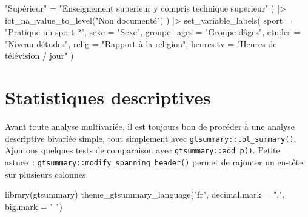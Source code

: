 \documentclass[
  letterpaper,
  DIV=11,
  numbers=noendperiod,
  oneside]{scrreprt}
\newenvironment{Shaded}{\begin{snugshade}}{\end{snugshade}}
\newcommand{\AttributeTok}[1]{\textcolor[rgb]{0.40,0.45,0.13}{#1}}
\newcommand{\FunctionTok}[1]{\textcolor[rgb]{0.28,0.35,0.67}{#1}}
\newcommand{\NormalTok}[1]{\textcolor[rgb]{0.00,0.23,0.31}{#1}}
\newcommand{\OtherTok}[1]{\textcolor[rgb]{0.00,0.23,0.31}{#1}}
\newcommand{\SpecialCharTok}[1]{\textcolor[rgb]{0.37,0.37,0.37}{#1}}
\newcommand{\StringTok}[1]{\textcolor[rgb]{0.13,0.47,0.30}{#1}}
\begin{document}
\begin{tcolorbox}
\begin{Shaded}
\begin{Highlighting}[]
        \StringTok{"Supérieur"} \OtherTok{=} \StringTok{"Enseignement superieur y compris technique superieur"}
\NormalTok{    ) }\SpecialCharTok{|\textgreater{}} 
    \FunctionTok{fct\_na\_value\_to\_level}\NormalTok{(}\StringTok{"Non documenté"}\NormalTok{)  }
\NormalTok{  ) }\SpecialCharTok{|\textgreater{}} 
  \FunctionTok{set\_variable\_labels}\NormalTok{(}
    \AttributeTok{sport =} \StringTok{"Pratique un sport ?"}\NormalTok{,}
    \AttributeTok{sexe =} \StringTok{"Sexe"}\NormalTok{,}
    \AttributeTok{groupe\_ages =} \StringTok{"Groupe d\textquotesingle{}âges"}\NormalTok{,}
    \AttributeTok{etudes =} \StringTok{"Niveau d\textquotesingle{}études"}\NormalTok{,}
    \AttributeTok{relig =} \StringTok{"Rapport à la religion"}\NormalTok{,}
    \AttributeTok{heures.tv =} \StringTok{"Heures de télévision / jour"}
\NormalTok{  )}
\end{Highlighting}
\end{Shaded}

\end{tcolorbox}

\hypertarget{statistiques-descriptives}{%
\section{Statistiques descriptives}\label{statistiques-descriptives}}

Avant toute analyse multivariée, il est toujours bon de procéder à une
analyse descriptive bivariée simple, tout simplement avec
\texttt{gtsummary::tbl\_summary()}. Ajoutons quelques tests de
comparaison avec \texttt{gtsummary::add\_p()}. Petite astuce~:
\texttt{gtsummary::modify\_spanning\_header()} permet de rajouter un
en-tête sur plusieurs colonnes.

\begin{Shaded}
\begin{Highlighting}[]
\FunctionTok{library}\NormalTok{(gtsummary)}
\FunctionTok{theme\_gtsummary\_language}\NormalTok{(}\StringTok{"fr"}\NormalTok{, }\AttributeTok{decimal.mark =} \StringTok{","}\NormalTok{, }\AttributeTok{big.mark =} \StringTok{" "}\NormalTok{)}
\end{Highlighting}
\end{Shaded}
\end{document}
